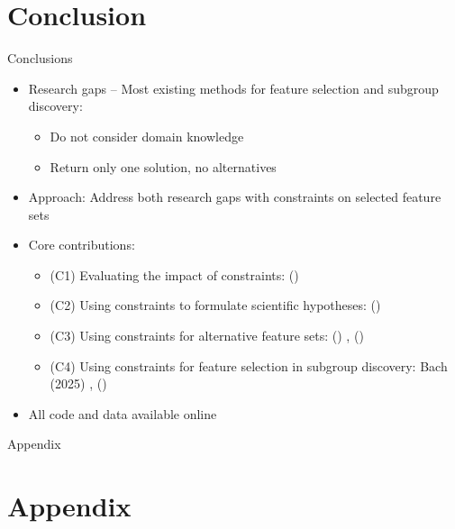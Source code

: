 \documentclass[en, navbarinline, handout]{sdqbeamer}
\newcommand{\longcite}[1]{\citeauthor{#1} (\citeyear{#1}) \cite{#1}}  %
\begin{document}
\section{Conclusion}

\begin{frame}[t]{Conclusions}
	\begin{itemize}
		\item Research gaps -- Most existing methods for feature selection and subgroup discovery:
		\begin{itemize}
			\item Do not consider domain knowledge
			\item Return only one solution, no alternatives
		\end{itemize}
		\pause
		\vspace{\baselineskip}
		\item Approach: Address both research gaps with constraints on selected feature sets
		\pause
		\vspace{\baselineskip}
		\item Core contributions:
		\begin{itemize}
			\item (C1) Evaluating the impact of constraints: \longcite{bach2022empirical}
			\item (C2) Using constraints to formulate scientific hypotheses: \longcite{bach2022empirical}
			\item (C3) Using constraints for alternative feature sets: \longcite{bach2023finding}, \longcite{bach2024alternative}
			\item (C4) Using constraints for feature selection in subgroup discovery: Bach (2025) \cite{bach2025subgroup}, \longcite{bach2024using} %
		\end{itemize}
		\item All code and data available online
	\end{itemize}
\end{frame}

\appendix
\beginbackup %

\begin{frame}[plain]
	\centering
	\Huge Appendix
\end{frame}

\section{Appendix}
\end{document}
